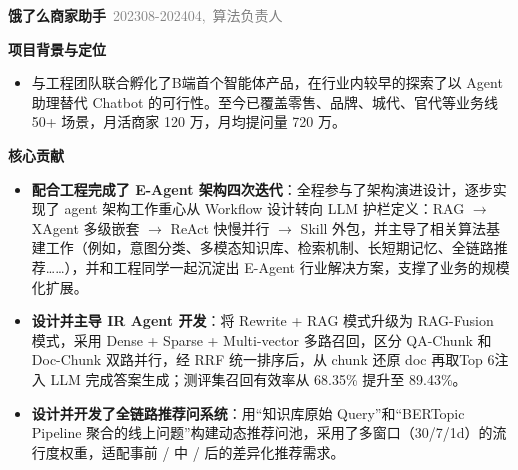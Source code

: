 \documentclass{resume}
\newenvironment{graybox}{%
  \begin{mdframed}[backgroundcolor=lightgray,linewidth=0pt,innerleftmargin=8pt,innerrightmargin=8pt,innertopmargin=6pt,innerbottommargin=6pt]
}{%
  \end{mdframed}
}
\begin{document}
\begin{graybox}
\noindent{\color{gray!40}\rule{\textwidth}{0.2pt}}
\textbf{饿了么商家助手}\ {\small\textcolor{gray}{\hfill 202308-202404,\ 算法负责人}}

\vspace{0.3em}
{\small\textbf{项目背景与定位}}
\begin{onehalfspacing}
\begin{itemize}
  \item 与工程团队联合孵化了B端首个智能体产品，在行业内较早的探索了以 Agent 助理替代 Chatbot 的可行性。至今已覆盖零售、品牌、城代、官代等业务线 50+ 场景，月活商家 120 万，月均提问量 720 万。
\end{itemize}
\end{onehalfspacing}

\vspace{0.3em}
{\small\textbf{核心贡献}}
\begin{onehalfspacing}
\begin{itemize}
  \item \textbf{配合工程完成了 E-Agent 架构四次迭代}：全程参与了架构演进设计，逐步实现了 agent 架构工作重心从 Workflow 设计转向 LLM 护栏定义：RAG $\rightarrow$ XAgent 多级嵌套 $\rightarrow$ ReAct 快慢并行 $\rightarrow$ Skill 外包，并主导了相关算法基建工作（例如，意图分类、多模态知识库、检索机制、长短期记忆、全链路推荐……），并和工程同学一起沉淀出 E-Agent 行业解决方案，支撑了业务的规模化扩展。
  \item \textbf{设计并主导 IR Agent 开发}：将 Rewrite + RAG 模式升级为 RAG-Fusion 模式，采用 Dense + Sparse + Multi-vector 多路召回，区分 QA-Chunk 和 Doc-Chunk 双路并行，经 RRF 统一排序后，从 chunk 还原 doc 再取Top 6注入 LLM 完成答案生成；测评集召回有效率从 68.35\% 提升至 89.43\%。
  \item \textbf{设计并开发了全链路推荐问系统}：用“知识库原始 Query”和“BERTopic Pipeline 聚合的线上问题”构建动态推荐问池，采用了多窗口（30/7/1d）的流行度权重，适配事前 / 中 / 后的差异化推荐需求。
\end{itemize}
\end{onehalfspacing}
\end{graybox}
\end{document}
